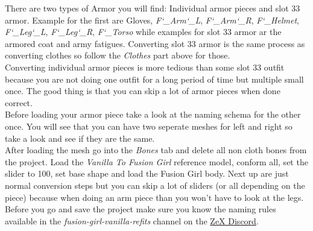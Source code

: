 There are two types of Armor you will find: Individual armor pieces and slot 33 armor. Example for the first are Gloves, \textit{F\char`_Arm\char`_L}, \textit{F\char`_Arm\char`_R}, \textit{F\char`_Helmet},
\textit{F\char`_Leg\char`_L}, \textit{F\char`_Leg\char`_R}, \textit{F\char`_Torso} while examples for slot 33 armor ar the armored coat and army fatigues. Converting slot 33 armor is the same process as converting clothes 
so follow the \textit{Clothes} part above for those.\\
Converting individual armor pieces is more tedious than some slot 33 outfit because you are not doing one outfit for a long period of time 
but multiple small once. The good thing is that you can skip a lot of armor pieces when done correct.\\
Before loading your armor piece take a look at the naming schema for the other once. You will see that you can have two seperate meshes for 
left and right so take a look and see if they are the same.\\
After loading the mesh go into the \textit{Bones} tab and delete all non cloth bones from the project. Load the \textit{Vanilla To Fusion Girl} 
reference model, conform all, set the slider to 100, set base shape and load the Fusion Girl body. Next up are just normal conversion 
steps but you can skip a lot of sliders (or all depending on the piece) because when doing an arm piece than you won't have to look at the legs.\\
Before you go and save the project make sure you know the naming rules available in the \textit{fusion-girl-vanilla-refits} channel 
on the \href{https://discord.gg/9vBqB9}{ZeX Discord}.